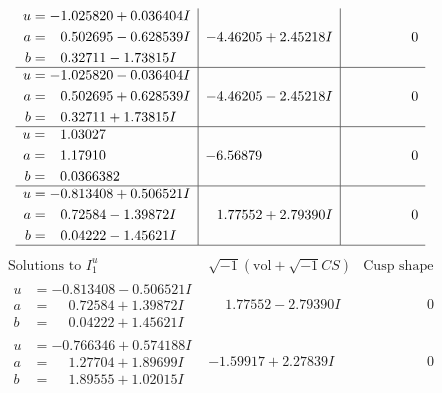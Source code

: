 \documentclass[1p]{elsarticle_modified}
\theoremstyle{definition}
\newcommand{\I}{\sqrt{-1}}
\begin{document}
$$\begin{array}{c|c|c}
\begin{aligned}
u &= -1.025820 + 0.036404 I \\
a &= \phantom{-}0.502695 - 0.628539 I \\
b &= \phantom{-}0.32711 - 1.73815 I\end{aligned}
 & -4.46205 + 2.45218 I & \phantom{-0.000000 } 0 \\ \hline\begin{aligned}
u &= -1.025820 - 0.036404 I \\
a &= \phantom{-}0.502695 + 0.628539 I \\
b &= \phantom{-}0.32711 + 1.73815 I\end{aligned}
 & -4.46205 - 2.45218 I & \phantom{-0.000000 } 0 \\ \hline\begin{aligned}
u &= \phantom{-}1.03027\phantom{ +0.000000I} \\
a &= \phantom{-}1.17910\phantom{ +0.000000I} \\
b &= \phantom{-}0.0366382\phantom{ +0.000000I}\end{aligned}
 & -6.56879\phantom{ +0.000000I} & \phantom{-0.000000 } 0 \\ \hline\begin{aligned}
u &= -0.813408 + 0.506521 I \\
a &= \phantom{-}0.72584 - 1.39872 I \\
b &= \phantom{-}0.04222 - 1.45621 I\end{aligned}
 & \phantom{-}1.77552 + 2.79390 I & \phantom{-0.000000 } 0\\
 \hline 
 \end{array}$$\newpage$$\begin{array}{c|c|c}  
\text{Solutions to }I^u_{1}& \I (\text{vol} + \sqrt{-1}CS) & \text{Cusp shape}\\
 \hline 
\begin{aligned}
u &= -0.813408 - 0.506521 I \\
a &= \phantom{-}0.72584 + 1.39872 I \\
b &= \phantom{-}0.04222 + 1.45621 I\end{aligned}
 & \phantom{-}1.77552 - 2.79390 I & \phantom{-0.000000 } 0 \\ \hline\begin{aligned}
u &= -0.766346 + 0.574188 I \\
a &= \phantom{-}1.27704 + 1.89699 I \\
b &= \phantom{-}1.89555 + 1.02015 I\end{aligned}
 & -1.59917 + 2.27839 I & \phantom{-0.000000 } 0 \\ \hline\begin{aligned}

\end{aligned}
\end{array}$$
\end{document}
